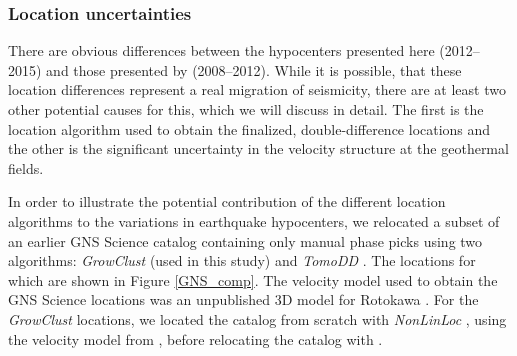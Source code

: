\subsubsection{Location uncertainties}\label{loc_uncertainty}
There are obvious differences between the hypocenters presented here (2012--2015) and those presented by \citet{Sherburn_2015,Sewell_2015WGC} (2008--2012). While it is possible, that these location differences represent a real migration of seismicity, there are at least two other potential causes for this, which we will discuss in detail. The first is the location algorithm used to obtain the finalized, double-difference locations and the other is the significant uncertainty in the velocity structure at the geothermal fields.

In order to illustrate the potential contribution of the different location algorithms to the variations in earthquake hypocenters, we relocated a subset of an earlier GNS Science catalog containing only manual phase picks using two algorithms: \textit{GrowClust} (used in this study) \citep{Trugman_2017} and \textit{TomoDD} \citep{Sherburn_2015,Sewell_2015WGC,zhang2003double}. The locations for which are shown in Figure \ref{GNS_comp}. The velocity model used to obtain the GNS Science locations was an unpublished 3D model for Rotokawa \citep{Sherburn_2015}. For the \textit{GrowClust} locations, we located the catalog from scratch with \textit{NonLinLoc} \citep{Lomax_2014}, using the velocity model from \citet{sewell2017}, before relocating the catalog with .

